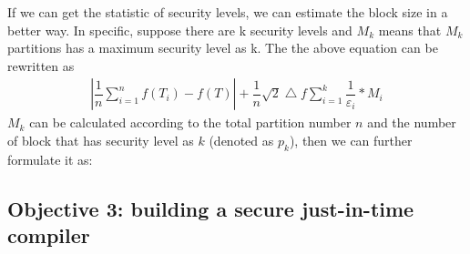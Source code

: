 If we can get the statistic of security levels, we can estimate the block
size in a better way. In specific, suppose there are k security levels and
$M_k$ means that $M_k$ partitions has a maximum security level as k. The the
above equation can be rewritten as
\begin{align}
  |\dfrac{1}{n}\sum\limits_{i=1}^n f(T_i) - f(T)| +  
\dfrac{1}{n}\sqrt{2}\bigtriangleup{f}\sum\limits_{i=1}^k\dfrac{1}{\varepsilon_i} 
* M_i
\end{align}
$M_k$ can be calculated according to the total partition number $n$ and
the number of block that has security level as $k$ (denoted as $p_k$), then
we can further formulate it as:




\vspace{-.15in}\subsection{Objective 3: building a 
secure just-in-time compiler}\label{sec:obj3}\vspace{-.075in}


